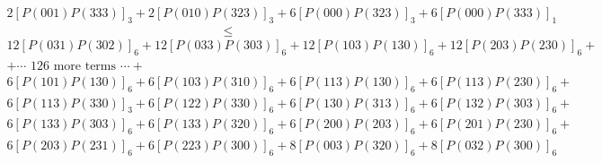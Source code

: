 \begin{gather*}
	2[P(001)P(333)]_{3} + 2[P(010)P(323)]_{3} + 6[P(000)P(323)]_{3} + 6[P(000)P(333)]_{1}
\end{gather*}
\[\leq\]
\begin{gather*}
	12[P(031)P(302)]_{6} + 12[P(033)P(303)]_{6} + 12[P(103)P(130)]_{6} + 12[P(203)P(230)]_{6} + \\
	+ \cdots \text{ 126 more terms } \cdots + \\
	6[P(101)P(130)]_{6} + 6[P(103)P(310)]_{6} +
	6[P(113)P(130)]_{6} + 6[P(113)P(230)]_{6} +\\
	6[P(113)P(330)]_{3} + 6[P(122)P(330)]_{6} +
	6[P(130)P(313)]_{6} + 6[P(132)P(303)]_{6} +\\
	6[P(133)P(303)]_{6} + 6[P(133)P(320)]_{6} +
	6[P(200)P(203)]_{6} + 6[P(201)P(230)]_{6} +\\
	6[P(203)P(231)]_{6} + 6[P(223)P(300)]_{6} +
	8[P(003)P(320)]_{6} + 8[P(032)P(300)]_{6}
\end{gather*}